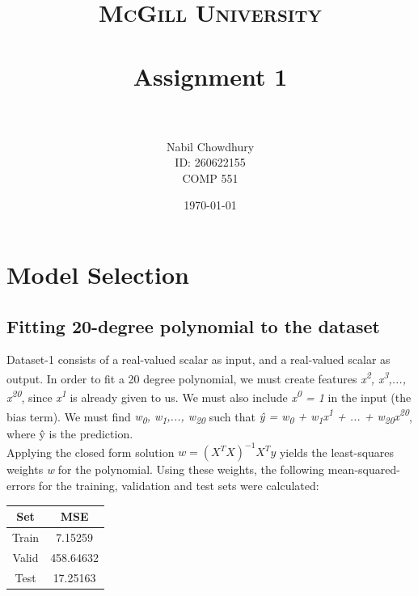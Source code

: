 \documentclass[paper=a4, fontsize=11pt]{scrartcl} %
\title{ 
\normalfont \normalsize 
\textsc{McGill University} \\ [25pt] %
\horrule{0.5pt} \\[0.4cm] %
\huge Assignment 1 \\ %
\horrule{2pt} \\[0.5cm] %
}
\author{
    Nabil Chowdhury \\
    \small{ID: 260622155} \\
    \small{COMP 551}
} %
\date{\normalsize\today} %
\numberwithin{equation}{section} %
\numberwithin{figure}{section} %
\numberwithin{table}{section} %
\begin{document}
\maketitle %


\section{Model Selection}
\subsection{Fitting 20-degree polynomial to the dataset}
Dataset-1 consists of a real-valued scalar as input, and a real-valued scalar as output. In order to fit a 20 degree polynomial, we must create features \textit{x\textsuperscript{2}, x\textsuperscript{3},..., x\textsuperscript{20}}, since \textit{x\textsuperscript{1}} is already given to us. We must also include \textit{x\textsuperscript{0} = 1} in the input (the bias term). We must find \textit{w\textsubscript{0}, w\textsubscript{1},..., w\textsubscript{20}} such that \textit{\^{y} = w\textsubscript{0} + w\textsubscript{1}x\textsuperscript{1} + ... + w\textsubscript{20}x\textsuperscript{20}}, where \^{y} is the prediction. \\

Applying the closed form solution  \(w = (X^TX)^{-1}X^Ty\) yields the least-squares weights \textit{w} for the polynomial. Using these weights, the following mean-squared-errors for the training, validation and test sets were calculated:

\begin{center}
\begin{tabular}{ |c|c| } 
    \hline
    \textbf{Set} & \textbf{MSE} \\ 
    \hline
    Train & 7.15259 \\
    Valid & 458.64632 \\ 
    Test & 17.25163 \\
    \hline
\end{tabular}
\end{center}
\end{document}

